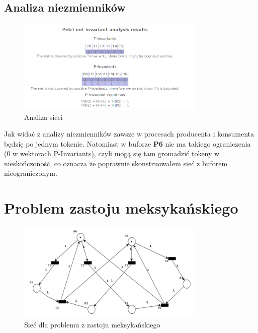 \documentclass{article}
\begin{document}
\subsection{Analiza niezmienników}
\begin{figure}[H]
    \centering
    \includegraphics[width=0.8\textwidth, height=0.4\textheight]{zad5_analiza.png}
    \caption{Analiza sieci}
\end{figure}

Jak widać z analizy niezmienników zawsze w procesach producenta i konsumenta będzię po jednym tokenie.
Natomiast w buforze \textbf{P6} nie ma takiego ograniczenia (0 w wektorach P-Invariants), czyli mogą się tam gromadzić tokeny w
nieskończoność, co oznacza że poprawnie skonstruowałem sieć z buforem nieograniczonym.

\section{Problem zastoju meksykańskiego}
\begin{figure}[H]
    \centering
    \includegraphics[width=0.8\textwidth, height=0.4\textheight]{zad6.png}
    \caption{Sieć dla problemu z zastoju meksykańskiego}
\end{figure}
\end{document}
